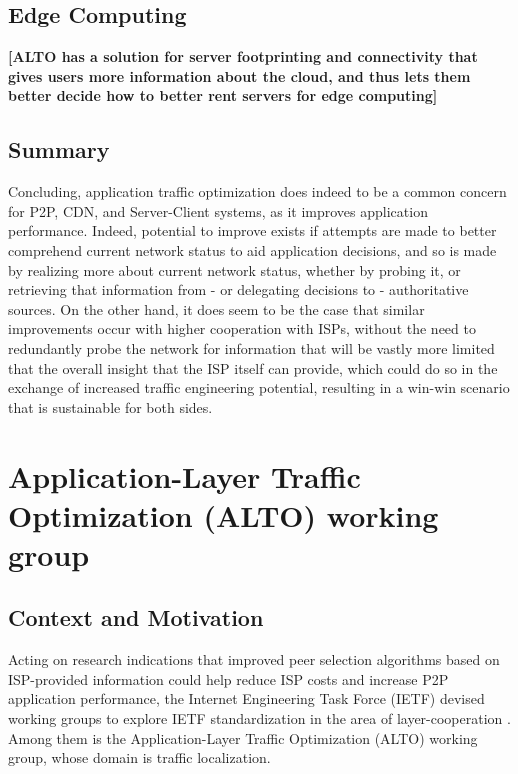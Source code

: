 
    \subsection{Edge Computing}

    \textbf{[ALTO has a solution for server footprinting and connectivity that gives users more information about the cloud, and thus lets them better decide how to better rent servers for edge computing]}


\subsection{Summary}

    Concluding, application traffic optimization does indeed to be a common concern for P2P, CDN, and Server-Client systems, as it improves application performance.
    Indeed, potential to improve exists if attempts are made to better comprehend current network status to aid application decisions, and so is made by realizing more about current network status, whether by probing it, or retrieving that information from - or delegating decisions to - authoritative sources.
    On the other hand, it does seem to be the case that similar improvements occur with higher cooperation with ISPs, without the need to redundantly probe the network for information that will be vastly more limited that the overall insight that the ISP itself can provide, which could do so in the exchange of increased traffic engineering potential, resulting in a win-win scenario that is sustainable for both sides.

\section{Application-Layer Traffic Optimization (ALTO) working group}

\subsection{Context and Motivation}

    Acting on research indications that improved peer selection algorithms based on ISP-provided information could help reduce ISP costs and increase P2P application performance, the Internet Engineering Task Force (IETF) devised working groups to explore IETF standardization in the area of layer-cooperation \cite{seedorf2009}.
    Among them is the Application-Layer Traffic Optimization (ALTO) working group, whose domain is traffic localization.


